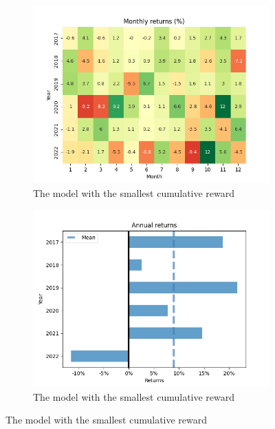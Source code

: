 \documentclass[../xlapes02]{subfiles}
\begin{document}
\begin{figure}[h!]
        \begin{subfigure}[t]{\experimentimgwidth\textwidth}
            \centering
            \includegraphics[width=\linewidth]{image/figure/monthly_returns_heatmap_min}
            \caption{The model with the smallest cumulative reward}
        \end{subfigure}
        \hfill
        \begin{subfigure}[t]{\experimentimgwidth\textwidth}
            \centering
            \includegraphics[width=\linewidth]{image/figure/annual_returns_min}
            \caption{The model with the smallest cumulative reward}
        \end{subfigure}
        \vspace{0.5cm}


\end{figure}
\end{document}
